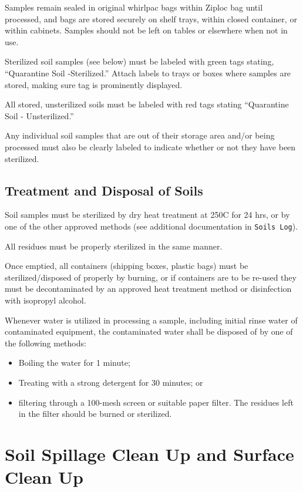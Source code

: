 \documentclass[12pt]{../SOP3}\usepackage[]{graphicx}\usepackage[]{color}
\begin{document}
\NP Samples remain sealed in original whirlpac bags within Ziploc bag until processed, and bags are stored securely on shelf trays, within closed container, or within cabinets. Samples should not be left on tables or elsewhere when not in use.

\NP Sterilized soil samples (see below) must be labeled with green tags stating, ``Quarantine Soil -Sterilized.'' Attach labels to trays or boxes where samples are stored, making sure tag is prominently displayed.

\NP All stored, unsterilized soils must be labeled with red tags stating ``Quarantine Soil - Unsterilized.''

\NP Any individual soil samples that are out of their storage area and/or being processed must also be clearly labeled to indicate whether or not they have been sterilized.


\subsection{Treatment and Disposal of Soils}

\NP Soil samples must be sterilized by dry heat treatment at 250\degree C for 24 hrs, or by one of the other approved methods (see additional documentation in \texttt{Soils Log}).

\NP All residues must be properly sterilized in the same manner.

\NP Once emptied, all containers (shipping boxes, plastic bags) must be sterilized/disposed of properly by burning, or if containers are to be re-used they must be decontaminated by an approved heat treatment method or disinfection with isopropyl alcohol.

\NP Whenever water is utilized in processing a sample, including initial rinse water of contaminated equipment, the contaminated water shall be disposed of by one of the following methods: 

\begin{itemize}
  \item Boiling the water for 1 minute; 
  \item Treating with a strong detergent for 30 minutes; or 
  \item filtering through a 100-mesh screen or suitable paper filter. The residues left in the filter should be burned or sterilized.
\end{itemize}

\section{Soil Spillage Clean Up and Surface Clean Up}
\end{document}
